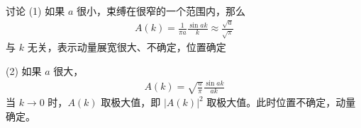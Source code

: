 讨论 (1) 如果 $a$ 很小，束缚在很窄的一个范围内，那么
\begin{eqnarray}
    A(k) = \frac{1}{\pi a} \frac{\sin ak}{k} \approx \frac{\sqrt{a}}{\sqrt\pi}
\end{eqnarray}
与 $k$ 无关，表示动量展宽很大、不确定，位置确定

(2) 如果 $a$ 很大，
\begin{eqnarray}
    A(k) = \sqrt{\frac{a}{\pi}} \frac{\sin ak}{ak}
\end{eqnarray}
当 $k\rightarrow 0$ 时，$A(k)$ 取极大值，即 $|A(k)|^2$ 取极大值。此时位置不确定，动量确定。


